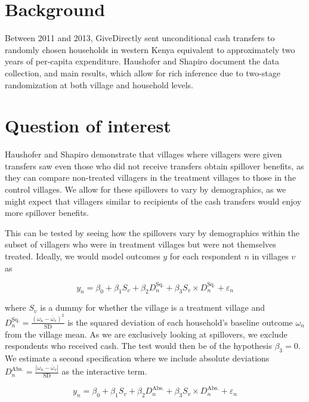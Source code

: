 \documentclass[11pt]{article}
\begin{document}
\section{Background}

Between 2011 and 2013, GiveDirectly sent unconditional cash transfers to randomly chosen households in western Kenya equivalent to approximately two years of per-capita expenditure.
Haushofer and Shapiro document the data collection, and main results, which allow for rich inference due to two-stage randomization at both village and household levels.

\section{Question of interest}

Haushofer and Shapiro demonstrate that villages where villagers were given transfers saw even those who did not receive transfers obtain spillover benefits, as they can compare non-treated villagers in the treatment villages to those in the control villages. We allow for these spillovers to vary by demographics, as we might expect that villagers similar to recipients of the cash transfers would enjoy more spillover benefits.

This can be tested by seeing how the spillovers vary by demographics within the subset of villagers who were in treatment villages but were not themselves treated. Ideally, we would model outcomes $y$ for each respondent $n$ in villages $v$ as

\begin{equation*}
y_n = \beta_0 + \beta_1 S_v + \beta_2 D^\text{Sq.}_n + \beta_3 S_v \times  D^\text{Sq.}_n + \varepsilon_n
\end{equation*}

where $S_v$ is a dummy for whether the village is a treatment village and $D^\text{Sq.}_n = \frac{(\omega_n - \bar{\omega}_v)^2}{\text{SD}}$ is the squared deviation of each household's baseline outcome $\omega_n$ from the village mean. As we are exclusively looking at spillovers, we exclude respondents who received cash. The test would then be of the hypothesis $\beta_3 = 0$. We estimate a second specification where we include absolute deviations $D^\text{Abs.}_n = \frac{|\omega_n - \bar{\omega}_v|}{\text{SD}}$ as the interactive term.

\begin{equation*}
y_n = \beta_0 + \beta_1 S_v + \beta_2 D^\text{Abs.}_n + \beta_3 S_v \times D^\text{Abs.}_n + \varepsilon_n
\end{equation*}
\end{document}
